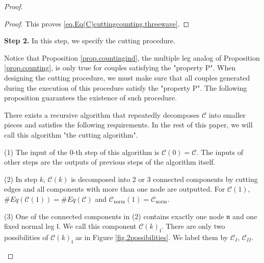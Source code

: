 \begin{proof}
\begin{proof}
This proves \eqref{eq.Eq(C)cuttingcounting.threewave}.
\end{proof}









\textbf{Step 2.} In this step, we specify the cutting procedure. 

Notice that Proposition \ref{prop.countingind}, the multiple leg analog of Proposition \ref{prop.counting}, is only true for couples satisfying the "property P". When designing the cutting procedure, we must make sure that all couples generated during the execution of this procedure satisfy the "property P". The following proposition guarantees the existence of such procedure.

\begin{prop}\label{prop.cuttingalgorithm}
There exists a recursive algorithm that repeatedly decomposes $\mathcal{C}$ into smaller pieces and satisfies the following requirements. In the rest of this paper, we will call this algorithm "the cutting algorithm".

(1) The input of the $0$-th step of this algorithm is $\mathcal{C}(0)=\mathcal{C}$. The inputs of other steps are the outputs of previous steps of the algorithm itself.

(2) In step $k$, $\mathcal{C}(k)$ is decomposed into 2 or 3 connected components by cutting edges and all components with more than one node are outputted. For $\mathcal{C}(1)$, $\# Eq(\mathcal{C}(1))=\# Eq(\mathcal{C})$ and $\mathcal{C}_{\text{norm}}(1)=\mathcal{C}_{\text{norm}}$.

(3) One of the connected components in (2) contains exactly one node $\mathfrak{n}$ and one fixed normal leg $\mathfrak{l}$. We call this component $\mathcal{C}(k)_{
\mathfrak{l}}$. There are only two possibilities of $\mathcal{C}(k)_{\mathfrak{l}}$ as in Figure \ref{fig.2possibilities}. We label them by $\mathcal{C}_{I}$, $\mathcal{C}_{II}$.

\begin{figure}[H]
    \centering
\end{figure}
\end{prop}
\end{proof}
